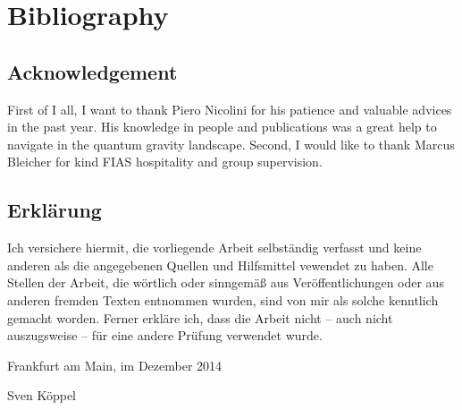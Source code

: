 \documentclass[12pt,a4paper]{report}
\numberwithin{equation}{chapter}
\newcommand{\tinychapter}[1]{%
\addtocounter{chapter}{1}%
\setcounter{section}{0}%
\setcounter{subsection}{0}%
\addcontentsline{toc}{chapter}{\protect\numberline{\thechapter} #1}
\section*{\thechapter\quad{} #1}}
\begin{document}
{\makeatletter
\renewcommand*{\addvspace}[1]{}
\makeatother}


\renewcommand{\bibsection}{}
\chapter*{Bibliography}
{}

\newpage
{}
\section*{Acknowledgement}
First of I all, I want to thank Piero Nicolini for his patience
and valuable advices in the past year. His knowledge in people
and publications was a great help to navigate in the quantum gravity
landscape. 
Second, I would like to thank Marcus Bleicher for kind FIAS
hospitality and group supervision.


\newpage
\section*{Erklärung}

Ich versichere hiermit, die vorliegende Arbeit selbständig
verfasst und keine anderen als die angegebenen Quellen und
Hilfsmittel vewendet zu haben. Alle Stellen der Arbeit, die
wörtlich oder sinngemäß aus Veröffentlichungen oder aus
anderen fremden Texten entnommen wurden, sind von mir als
solche kenntlich gemacht worden. Ferner erkläre ich, dass
die Arbeit nicht -- auch nicht auszugsweise -- für eine
andere Prüfung verwendet wurde.

\vspace{1cm}\noindent
Frankfurt am Main, im Dezember 2014

\vspace{2cm}\noindent
Sven Köppel
\end{document}
